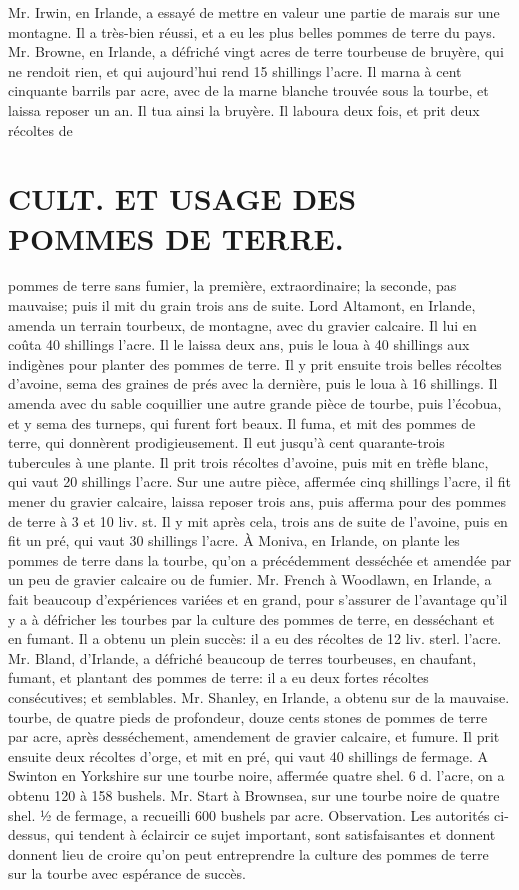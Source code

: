Mr. Irwin, en Irlande, a essayé de mettre en valeur une partie de marais sur une montagne. Il a très-bien réussi, et a eu les plus belles pommes de terre du pays.
Mr. Browne, en Irlande, a défriché vingt acres de terre tourbeuse de bruyère, qui ne rendoit rien, et qui aujourd'hui rend 15 shillings l'acre. Il marna à cent cinquante barrils par acre, avec de la marne blanche trouvée sous la tourbe, et laissa reposer un an. Il tua ainsi la bruyère. Il laboura deux fois, et prit deux récoltes de\setcounter{page}{271} \section{CULT. ET USAGE DES POMMES DE TERRE.}
pommes de terre sans fumier, la première, extraordinaire; la seconde, pas mauvaise; puis il mit du grain trois ans de suite. Lord Altamont, en Irlande, amenda un terrain tourbeux, de montagne, avec du gravier calcaire. Il lui en coûta 40 shillings l'acre. Il le laissa deux ans, puis le loua à 40 shillings aux indigènes pour planter des pommes de terre. Il y prit ensuite trois belles récoltes d'avoine, sema des graines de prés avec la dernière, puis le loua à 16 shillings. Il amenda avec du sable coquillier une autre grande pièce de tourbe, puis l'écobua, et y sema des turneps, qui furent fort beaux. Il fuma, et mit des pommes de terre, qui donnèrent prodigieusement. Il eut jusqu'à cent quarante-trois tubercules à une plante. Il prit trois récoltes d'avoine, puis mit en trèfle blanc, qui vaut 20 shillings l'acre. Sur une autre pièce, affermée cinq shillings l'acre, il fit mener du gravier calcaire, laissa reposer trois ans, puis afferma pour des pommes de terre à 3 et 10 liv. st. Il y mit après cela, trois ans de suite de l'avoine, puis en fit un pré, qui vaut 30 shillings l'acre. À Moniva, en Irlande, on plante les pommes de terre dans la tourbe, qu'on a précédemment desséchée et amendée par un peu de gravier calcaire ou de fumier.\setcounter{page}{272} Mr. French à Woodlawn, en Irlande, a fait beaucoup d'expériences variées et en grand, pour s'assurer de l'avantage qu'il y a à défricher les tourbes par la culture des pommes de terre, en desséchant et en fumant. Il a obtenu un plein succès: il a eu des récoltes de 12 liv. sterl. l'acre.
Mr. Bland, d'Irlande, a défriché beaucoup de terres tourbeuses, en chaufant, fumant, et plantant des pommes de terre: il a eu deux fortes récoltes consécutives; et semblables.
Mr. Shanley, en Irlande, a obtenu sur de la mauvaise. tourbe, de quatre pieds de profondeur, douze cents stones de pommes de terre par acre, après desséchement, amendement de gravier calcaire, et fumure. Il prit ensuite deux récoltes d'orge, et mit en pré, qui vaut 40 shillings de fermage.
A Swinton en Yorkshire sur une tourbe noire, affermée quatre shel. 6 d. l'acre, on a obtenu 120 à 158 bushels.
Mr. Start à Brownsea, sur une tourbe noire de quatre shel. ½ de fermage, a recueilli 600 bushels par acre.
Observation. Les autorités ci-dessus, qui tendent à éclaircir ce sujet important, sont satisfaisantes et donnent\setcounter{page}{273} donnent lieu de croire qu'on peut entreprendre la culture des pommes de terre sur la tourbe avec espérance de succès.
